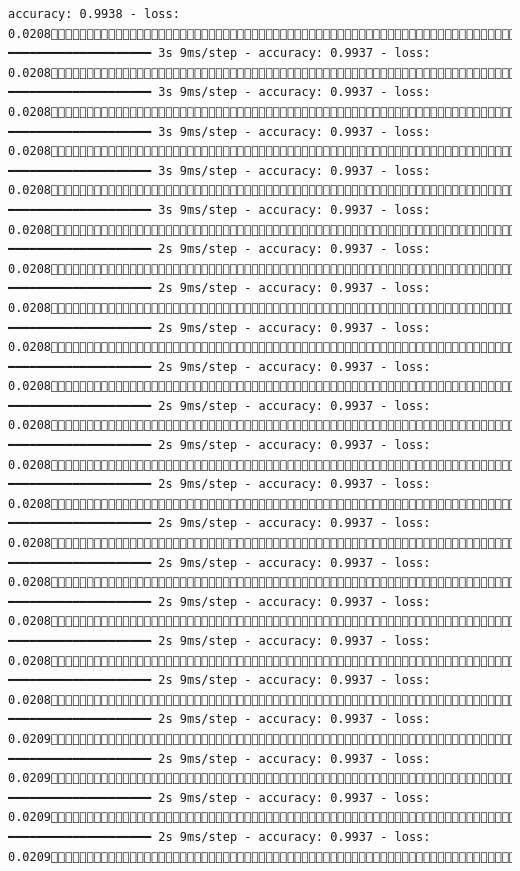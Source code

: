\documentclass[
  letterpaper,
  DIV=11,
  numbers=noendperiod]{scrreprt}
\begin{document}
\begin{verbatim}
accuracy: 0.9938 - loss: 0.02081498/1875 ━━━━━━━━━━━━━━━━━━━━ 3s 9ms/step - accuracy: 0.9937 - loss: 0.02081505/1875 ━━━━━━━━━━━━━━━━━━━━ 3s 9ms/step - accuracy: 0.9937 - loss: 0.02081512/1875 ━━━━━━━━━━━━━━━━━━━━ 3s 9ms/step - accuracy: 0.9937 - loss: 0.02081519/1875 ━━━━━━━━━━━━━━━━━━━━ 3s 9ms/step - accuracy: 0.9937 - loss: 0.02081526/1875 ━━━━━━━━━━━━━━━━━━━━ 3s 9ms/step - accuracy: 0.9937 - loss: 0.02081533/1875 ━━━━━━━━━━━━━━━━━━━━ 2s 9ms/step - accuracy: 0.9937 - loss: 0.02081540/1875 ━━━━━━━━━━━━━━━━━━━━ 2s 9ms/step - accuracy: 0.9937 - loss: 0.02081547/1875 ━━━━━━━━━━━━━━━━━━━━ 2s 9ms/step - accuracy: 0.9937 - loss: 0.02081553/1875 ━━━━━━━━━━━━━━━━━━━━ 2s 9ms/step - accuracy: 0.9937 - loss: 0.02081560/1875 ━━━━━━━━━━━━━━━━━━━━ 2s 9ms/step - accuracy: 0.9937 - loss: 0.02081567/1875 ━━━━━━━━━━━━━━━━━━━━ 2s 9ms/step - accuracy: 0.9937 - loss: 0.02081574/1875 ━━━━━━━━━━━━━━━━━━━━ 2s 9ms/step - accuracy: 0.9937 - loss: 0.02081580/1875 ━━━━━━━━━━━━━━━━━━━━ 2s 9ms/step - accuracy: 0.9937 - loss: 0.02081588/1875 ━━━━━━━━━━━━━━━━━━━━ 2s 9ms/step - accuracy: 0.9937 - loss: 0.02081595/1875 ━━━━━━━━━━━━━━━━━━━━ 2s 9ms/step - accuracy: 0.9937 - loss: 0.02081602/1875 ━━━━━━━━━━━━━━━━━━━━ 2s 9ms/step - accuracy: 0.9937 - loss: 0.02081609/1875 ━━━━━━━━━━━━━━━━━━━━ 2s 9ms/step - accuracy: 0.9937 - loss: 0.02081616/1875 ━━━━━━━━━━━━━━━━━━━━ 2s 9ms/step - accuracy: 0.9937 - loss: 0.02091623/1875 ━━━━━━━━━━━━━━━━━━━━ 2s 9ms/step - accuracy: 0.9937 - loss: 0.02091630/1875 ━━━━━━━━━━━━━━━━━━━━ 2s 9ms/step - accuracy: 0.9937 - loss: 0.02091637/1875 ━━━━━━━━━━━━━━━━━━━━ 2s 9ms/step - accuracy: 0.9937 - loss: 0.02091643/1875 
\end{verbatim}
\end{document}
